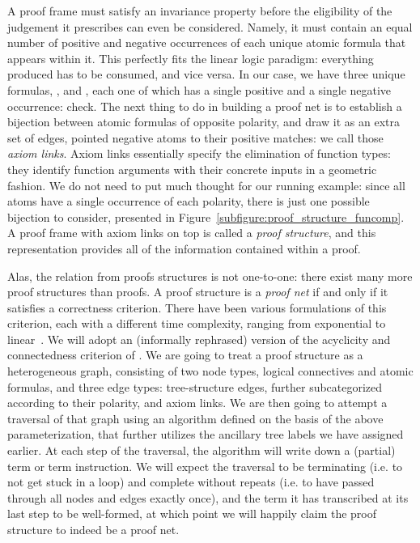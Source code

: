 A proof frame must satisfy an invariance property before the eligibility of the judgement it prescribes can even be considered.
Namely, it must contain an equal number of positive and negative occurrences of each unique atomic formula that appears within it.
This perfectly fits the linear logic paradigm: everything produced has to be consumed, and vice versa.
In our case, we have three unique formulas, ,  and , each one of which has a single positive and a single negative occurrence: check.
The next thing to do in building a proof net is to establish a bijection between atomic formulas of opposite polarity, and draw it as an extra set of edges, pointed negative atoms to their positive matches: we call those \textit{axiom links}.
Axiom links essentially specify the elimination of function types: they identify function arguments with their concrete inputs in a geometric fashion.
We do not need to put much thought for our running example: since all atoms have a single occurrence of each polarity, there is just one possible bijection to consider, presented in Figure~\ref{subfigure:proof_structure_funcomp}.
A proof frame with axiom links on top is called a \textit{proof structure}, and this representation provides all of the information contained within a proof.

Alas, the relation from proofs structures is not one-to-one: there exist many more proof structures than proofs.
A proof structure is a \textit{proof net} if and only if it satisfies a correctness criterion.
There have been various formulations of this criterion, each with a different time complexity, ranging from exponential to linear~\cite{girard1987linear,danos1989structure,murawski2000dominator,guerrini2011linear}.
We will adopt an (informally rephrased) version of the acyclicity and connectedness criterion of \citet{danos1989structure}.
We are going to treat a proof structure as a heterogeneous graph, consisting of two node types, logical connectives and atomic formulas, and three edge types: tree-structure edges, further subcategorized according to their polarity, and axiom links.
We are then going to attempt a traversal of that graph using an algorithm defined on the basis of the above parameterization, that further utilizes the  ancillary tree labels we have assigned earlier.
At each step of the traversal, the algorithm will write down a (partial) term or term instruction.
We will expect the traversal to be terminating (i.e. to not get stuck in a loop) and complete without repeats (i.e. to have passed through all nodes and edges exactly once), and the term it has transcribed at its last step to be well-formed, at which point we will happily claim the proof structure to indeed be a proof net.

